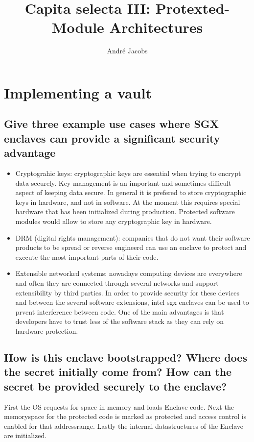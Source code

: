 \documentclass{article}
\begin{document}
\title{Capita selecta III: Protexted-Module Architectures} 
\author{André Jacobs}
\date{}
\maketitle
\section{Implementing a vault}

\subsection{Give three example use cases where SGX enclaves can provide a significant
security advantage}

\begin{itemize}
  \item Cryptograhic keys: cryptographic keys are essential when trying to
    encrypt data securely. Key management is an important and sometimes
    difficult aspect of keeping data secure. In general it is prefered to store
    cryptographic keys in hardware, and not in software. At the moment this
    requires special hardware that has been initialized during production. Protected software
    modules would allow to store any cryptographic key in hardware.
  \item DRM (digital rights management): companies that do not want their
    software products to be spread or reverse engineerd can use an enclave to
    protect and execute the most important parts of their code. 
  \item Extensible networked systems: nowadays computing devices are everywhere
    and often they are connected through several networks and support
    extensibility by third parties. In order to provide security for these
    devices and between the several software extensions, intel sgx enclaves can
    be used to prvent interference between code. One of the main advantages is
    that developers have to trust less of the software stack as they can rely on
    hardware protection.
\end{itemize}

\subsection{How is this enclave bootstrapped?  Where does the secret initially come
from?  How can the secret be provided securely to the enclave?}
First the OS requests for space in memory and loads Enclave code. Next the memoryspace for the protected code is marked as protected
and access control is enabled for that addressrange. Lastly the internal
datastructures of the Enclave are initialized. 
\end{document}
